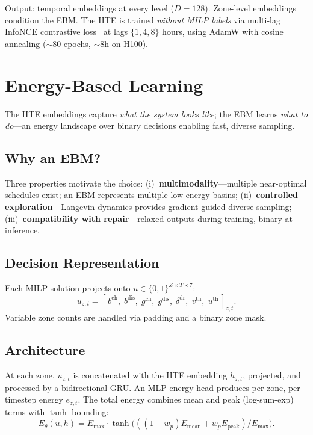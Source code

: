 \documentclass{article}
\begin{document}
Output: temporal embeddings at every level ($D = 128$). Zone-level embeddings condition the EBM. The HTE is trained \emph{without MILP labels} via multi-lag InfoNCE contrastive loss~\citep{oord2018representation} at lags $\{1, 4, 8\}$ hours, using AdamW with cosine annealing ($\sim$80 epochs, $\sim$8h on H100).


\section{Energy-Based Learning}
\label{sec:ebm}

The HTE embeddings capture \emph{what the system looks like}; the EBM learns \emph{what to do}---an energy landscape over binary decisions enabling fast, diverse sampling.

\subsection{Why an EBM?}

Three properties motivate the choice: (i)~\textbf{multimodality}---multiple near-optimal schedules exist; an EBM represents multiple low-energy basins; (ii)~\textbf{controlled exploration}---Langevin dynamics provides gradient-guided diverse sampling; (iii)~\textbf{compatibility with repair}---relaxed outputs during training, binary at inference.

\subsection{Decision Representation}

Each MILP solution projects onto $u \in \{0,1\}^{Z \times T \times 7}$:
\begin{equation}
u_{z,t} = [\,b^{\mathrm{ch}},\; b^{\mathrm{dis}},\; g^{\mathrm{ch}},\; g^{\mathrm{dis}},\; \delta^{\mathrm{dr}},\; v^{\mathrm{th}},\; u^{\mathrm{th}}\,]_{z,t}.
\end{equation}
Variable zone counts are handled via padding and a binary zone mask.

\subsection{Architecture}

At each zone, $u_{z,t}$ is concatenated with the HTE embedding $h_{z,t}$, projected, and processed by a bidirectional GRU. An MLP energy head produces per-zone, per-timestep energy $e_{z,t}$. The total energy combines mean and peak (log-sum-exp) terms with $\tanh$ bounding:
\begin{equation}
E_\theta(u, h) = E_{\max} \cdot \tanh\!\bigl(((1{-}w_p) E_{\mathrm{mean}} + w_p E_{\mathrm{peak}}) / E_{\max}\bigr).
\end{equation}
\end{document}

